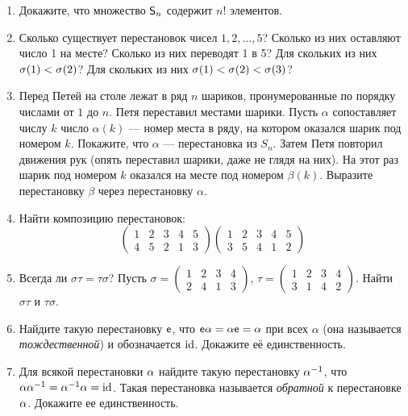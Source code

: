 \begin{enumerate}
\item Докажите, что множество ${\mathsf{S}}_n$ содержит $n!$ элементов.

\item \ipunkt Сколько существует перестановок чисел $1, 2, \dots , 5$? Сколько
из них оставляют число 1 на месте? \ipunkt Сколько из них переводят 1
в 5? \ipunkt Для скольких из них $\sigma(1) < \sigma(2)$? \ipunkt Для скольких из них
$\sigma(1) < \sigma(2) < \sigma(3)$?


\item \label{peter} Перед Петей на столе лежат в ряд $n$ шариков, пронумерованные по порядку числами от $1$ до $n$. Петя переставил местами шарики. Пусть $\alpha$ сопоставляет числу $k$ число $\alpha(k)$ --- номер места в ряду, на котором оказался шарик под номером $k$. \ipunkt Покажите, что $\alpha$ --- перестановка из $S_n$.
\ipunkt Затем Петя повторил движения рук (опять переставил шарики, даже не глядя на них). На этот раз шарик под номером $k$ оказался на месте под номером $\beta(k)$. Выразите перестановку $\beta$ через перестановку $\alpha$.

\item Найти композицию перестановок:
$$
\begin{pmatrix}
1&2&3&4&5 \\
4&5&2&1&3
\end{pmatrix}
\begin{pmatrix}
1&2&3&4&5 \\
3&5&4&1&2
\end{pmatrix}
$$


\item \ipunkt
Всегда ли $\sigma\tau=\tau\sigma$?
\ipunkt
Пусть
$\sigma=\displaystyle\begin{pmatrix}1&2&3&4\\2&4&1&3\end{pmatrix}$,
$\tau=\displaystyle\begin{pmatrix}1&2&3&4\\3&1&4&2\end{pmatrix}$.
Найти $\sigma\tau$ и $\tau\sigma$.

\item Найдите такую перестановку $\mathsf e$, что $\mathsf e\alpha=\alpha \mathsf e=\alpha$ при всех $\alpha$ (она называется {\it тождественной}) и обозначается $\mathrm{id}$. Докажите её единственность.

\item Для всякой перестановки $\alpha$ найдите такую перестановку $\alpha^{-1}$, что $\alpha\alpha^{-1}=\alpha^{-1}\alpha=\mathrm{id}$. Такая перестановка называется \textit{обратной} к перестановке $\alpha$. Докажите ее единственность.


\end{enumerate}
